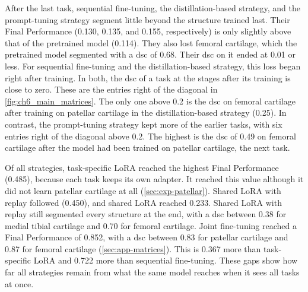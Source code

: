After the last task, sequential fine-tuning, the distillation-based strategy, and the prompt-tuning strategy segment little beyond the structure trained last.
Their Final Performance (0.130, 0.135, and 0.155, respectively) is only slightly above that of the pretrained model (0.114).
They also lost femoral cartilage, which the pretrained model segmented with a \gls{dsc} of 0.68.
Their \gls{dsc} on it ended at 0.01 or less.
For sequential fine-tuning and the distillation-based strategy, this loss began right after training.
In both, the \gls{dsc} of a task at the stages after its training is close to zero.
These are the entries right of the diagonal in \cref{fig:ch6_main_matrices}.
The only one above 0.2 is the \gls{dsc} on femoral cartilage after training on patellar cartilage in the distillation-based strategy (0.25).
In contrast, the prompt-tuning strategy kept more of the earlier tasks, with six entries right of the diagonal above 0.2.
The highest is the \gls{dsc} of 0.49 on femoral cartilage after the model had been trained on patellar cartilage, the next task.

Of all strategies, task-specific LoRA reached the highest Final Performance (0.485), because each task keeps its own adapter.
It reached this value although it did not learn patellar cartilage at all (\cref{sec:exp-patellar}).
Shared LoRA with replay followed (0.450), and shared LoRA reached 0.233.
Shared LoRA with replay still segmented every structure at the end, with a \gls{dsc} between 0.38 for medial tibial cartilage and 0.70 for femoral cartilage.
Joint fine-tuning reached a Final Performance of 0.852, with a \gls{dsc} between 0.83 for patellar cartilage and 0.87 for femoral cartilage (\cref{sec:app-matrices}).
This is 0.367 more than task-specific LoRA and 0.722 more than sequential fine-tuning.
These gaps show how far all strategies remain from what the same model reaches when it sees all tasks at once.

